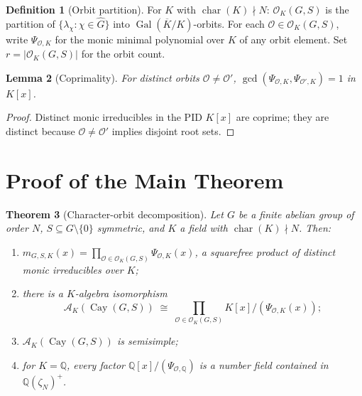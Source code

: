 \documentclass[12pt]{amsart}
\numberwithin{equation}{section}
\theoremstyle{plain}
\newtheorem{theorem}{Theorem}[section]
\newtheorem{lemma}[theorem]{Lemma}
\theoremstyle{definition}
\newtheorem{definition}[theorem]{Definition}
\DeclareMathOperator{\Gal}{Gal}
\DeclareMathOperator{\ch}{char}
\DeclareMathOperator{\Cay}{Cay}
\newcommand{\Q}{\mathbb{Q}}
\newcommand{\calA}{\mathcal{A}}
\newcommand{\calO}{\mathcal{O}}
\newcommand{\Ghat}{\widehat{G}}
\begin{document}
\begin{definition}[Orbit partition]
\label{def:orbits}
For $K$ with $\ch(K) \nmid N$: $\calO_K(G,S)$ is the partition of
$\{\lambda_\chi : \chi \in \Ghat\}$ into $\Gal(\overline{K}/K)$-orbits.
For each $\calO \in \calO_K(G,S)$, write $\Psi_{\calO,K}$ for the
monic minimal polynomial over $K$ of any orbit element.  Set
$r = |\calO_K(G,S)|$ for the orbit count.
\end{definition}

\begin{lemma}[Coprimality]
\label{lem:coprime}
For distinct orbits $\calO \ne \calO'$,
$\gcd(\Psi_{\calO,K}, \Psi_{\calO',K}) = 1$ in $K[x]$.
\end{lemma}

\begin{proof}
Distinct monic irreducibles in the PID $K[x]$ are coprime; they are
distinct because $\calO \ne \calO'$ implies disjoint root sets.
\end{proof}

\section{Proof of the Main Theorem}
\label{sec:proof}

\begin{theorem}[Character-orbit decomposition]
\label{thm:main}
Let $G$ be a finite abelian group of order $N$, $S \subseteq G
\setminus \{0\}$ symmetric, and $K$ a field with $\ch(K) \nmid N$.  Then:
\begin{enumerate}[label=\textup{(\roman*)}]
  \item $m_{G,S,K}(x) = \prod_{\calO \in \calO_K(G,S)} \Psi_{\calO,K}(x)$,
        a squarefree product of distinct monic irreducibles over $K$;
  \item there is a $K$-algebra isomorphism
        \[
          \calA_K(\Cay(G,S))
          \;\cong\;
          \prod_{\calO \in \calO_K(G,S)} K[x]/(\Psi_{\calO,K}(x));
        \]
  \item $\calA_K(\Cay(G,S))$ is semisimple;
  \item for $K = \Q$, every factor $\Q[x]/(\Psi_{\calO,\Q})$ is a number
        field contained in $\Q(\zeta_N)^+$.
\end{enumerate}
\end{theorem}
\end{document}
